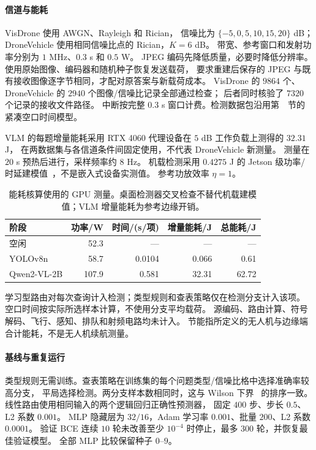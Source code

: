 \paragraph{信道与能耗}\label{subsec:energy-exp}
VisDrone 使用 AWGN、Rayleigh 和 Rician，
信噪比为 $\{-5,0,5,10,15,20\}$ dB；
DroneVehicle 使用相同信噪比点的 Rician，$K=6$ dB。
带宽、参考窗口和发射功率分别为 $1$ MHz、$0.3$ s 和 $0.5$ W。
JPEG 编码先降低质量，必要时降低分辨率。
使用原始图像、编码器和随机种子恢复发送载荷，
要求重建后保存的 JPEG 与既有接收图像逐字节相同，才配对原答案与新载荷成本。
VisDrone 的 $9864$ 个、DroneVehicle 的 $2940$ 个图像/信噪比记录全部通过检查；
后者同时核验了 $7320$ 个记录的接收文件路径。
中断按完整 $0.3$ s 窗口计费。检测数据包沿用第~~节的紧凑空口时间模型。

VLM 的每题增量能耗采用 RTX 4060 代理设备在 $5$ dB 工作负载上测得的 $32.31$ J，
在两数据集与各信道条件间固定使用，不代表 DroneVehicle 新测量。
测量在 $20$ s 预热后进行，采样频率约 $8$ Hz。
机载检测采用 $0.4275$ J 的 Jetson 级功率/时延建模值~\cite{nvidia2024orinnano}，不是嵌入式设备实测值。
参考功放效率 $\eta=1$。
\begin{table}[ht]\centering
\caption{能耗核算使用的 GPU 测量。桌面检测器交叉检查不替代机载建模值；VLM 增量能耗为参考边缘开销。}\label{tab:power}
\begin{tabular}{lrrrr}\toprule
阶段 & 功率/W & 时间/(s/项) & 增量能耗/J & 总能耗/J\\\midrule
空闲 & 52.3 & --- & --- & ---\\
YOLOv8n & 58.7 & 0.0104 & 0.066 & 0.61\\
Qwen2-VL-2B & 107.9 & 0.581 & 32.31 & 62.72\\
\bottomrule\end{tabular}
\end{table}

学习型路由对每次查询计入检测；类型规则和查表策略仅在检测分支计入该项。
空口时间按实际所选样本计算，不使用分支平均载荷。
源编码、路由计算、符号解码、飞行、感知、排队和射频电路均未计入。
节能指所定义的无人机与边缘端合计能耗，不是无人机续航测量。

\paragraph{基线与重复运行}
类型规则无需训练。查表策略在训练集的每个问题类型/信噪比格中选择准确率较高分支，
平局选择检测。两分支样本数相同时，这与 Wilson 下界~\cite{wilson1927probable} 的排序一致。
线性路由使用相同输入的两个逻辑回归正确性预测器，
固定 $400$ 步、步长 $0.5$、L2 系数 $0.001$。
MLP 隐藏层为 $32/16$，Adam 学习率 $0.001$、批量 $200$、L2 系数 $0.0001$。
验证 BCE 连续 $10$ 轮未改善至少 $10^{-4}$ 时停止，最多 $300$ 轮，并恢复最佳验证模型。
全部 MLP 比较保留种子 $0$--$9$。


